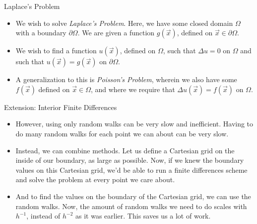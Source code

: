 \documentclass{beamer}
\newcommand\di\partial
\newcommand\pars[1]{\left(#1\right)}
\begin{document}
\begin{frame}{Laplace's Problem}
\begin{itemize}
\item We wish to solve \emph{Laplace's Problem}.
Here, we have some closed domain $\Omega$ with a boundary $\di\Omega$.
We are given a function $g\pars{\vec{x}}$, defined on $\vec{x}\in\di\Omega$.
\item We wish to find a function $u\pars{\vec{x}}$, defined on $\Omega$,
such that $\Delta u=0$ on $\Omega$
and such that $u\pars{\vec{x}}=g\pars{\vec{x}}$ on $\di\Omega$.
\item A generalization to this is \emph{Poisson's Problem},
wherein we also have some $f\pars{\vec{x}}$ defined on $\vec{x}\in\Omega$,
and where we require that $\Delta u\pars{\vec{x}}=f\pars{\vec{x}}$ on $\Omega$.
\end{itemize}
\end{frame}

\begin{frame}{Extension: Interior Finite Differences}
\begin{itemize}
\item However, using only random walks can be very slow and inefficient.
Having to do many random walks for each point we can about can be very slow.
\item Instead, we can combine methods.
Let us define a Cartesian grid on the inside of our boundary,
as large as possible.
Now, if we knew the boundary values on this Cartesian grid,
we'd be able to run a finite differences scheme
and solve the problem at every point we care about.
\item And to find the values on the boundary of the Cartesian grid,
we can use the random walks.
Now, the amount of random walks we need to do scales with $h^{-1}$,
instead of $h^{-2}$ as it was earlier.
This saves us a lot of work.
\end{itemize}
\end{frame}
\end{document}
